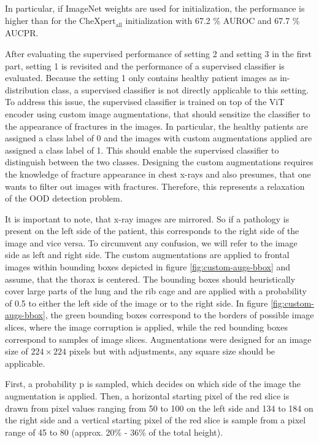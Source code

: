 In particular, if ImageNet weights are used for initialization, the performance is higher than for the $\text{CheXpert}_\text{all}$ initialization with 67.2 \% AUROC and 67.7 \% AUCPR.
\par
After evaluating the supervised performance of setting 2 and setting 3 in the first part, setting 1 is revisited and the performance of a supervised classifier is evaluated.
Because the setting 1 only contains healthy patient images as in-distribution class, a supervised classifier is not directly applicable to this setting.
To address this issue, the supervised classifier is trained on top of the ViT encoder using custom image augmentations, that should sensitize the classifier to the appearance of fractures in the images.
In particular, the healthy patients are assigned a class label of 0 and the images with custom augmentations applied are assigned a class label of 1.
This should enable the supervised classifier to distinguish between the two classes.
Designing the custom augmentations requires the knowledge of fracture appearance in chest x-rays and also presumes, that one wants to filter out images with fractures.
Therefore, this represents a relaxation of the OOD detection problem.
\par
It is important to note, that x-ray images are mirrored.
So if a pathology is present on the left side of the patient, this corresponds to the right side of the image and vice versa.
To circumvent any confusion, we will refer to the image side as left and right side.
The custom augmentations are applied to frontal images within bounding boxes depicted in figure \ref{fig:custom-augs-bbox} and assume, that the thorax is centered.
The bounding boxes should heuristically cover large parts of the lung and the rib cage and are applied with a probability of 0.5 to either the left side of the image or to the right side.
In figure \ref{fig:custom-augs-bbox}, the green bounding boxes correspond to the borders of possible image slices, where the image corruption is applied, while the red bounding boxes correspond to samples of image slices.
Augmentations were designed for an image size of $224\times224$ pixels but with adjustments, any square size should be applicable.
\par
First, a probability p is sampled, which decides on which side of the image the augmentation is applied.
Then, a horizontal starting pixel of the red slice is drawn from pixel values ranging from 50 to 100 on the left side and 134 to 184 on the right side and a vertical starting pixel of the red slice is sample from a pixel range of 45 to 80 (approx. 20\% - 36\% of the total height).
